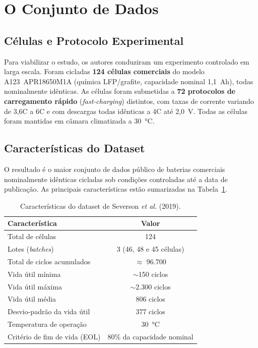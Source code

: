 \documentclass[12pt, a4paper]{article}
\begin{document}
\section{O Conjunto de Dados}

\subsection{Células e Protocolo Experimental}

Para viabilizar o estudo, os autores conduziram um experimento controlado em
larga escala. Foram cicladas \textbf{124 células comerciais} do modelo
A123~APR18650M1A (química LFP/grafite, capacidade nominal 1,1~Ah), todas
nominalmente idênticas. As células foram submetidas a \textbf{72 protocolos
de carregamento rápido} (\textit{fast-charging}) distintos, com taxas de
corrente variando de 3,6C a 6C e com descargas todas idênticas a 4C até
2,0~V. Todas as células foram mantidas em câmara climatizada a 30~°C.

\subsection{Características do Dataset}

O resultado é o maior conjunto de dados público de baterias comerciais
nominalmente idênticas cicladas sob condições controladas até a data de
publicação. As principais características estão sumarizadas na
Tabela~\ref{tab:dataset}.

\begin{table}[ht]
  \centering
  \caption{Características do dataset de Severson \textit{et al.} (2019).}
  \label{tab:dataset}
  \begin{tabular}{lc}
    \toprule
    \textbf{Característica} & \textbf{Valor} \\
    \midrule
    Total de células             & 124 \\
    Lotes (\textit{batches})     & 3 (46, 48 e 45 células) \\
    Total de ciclos acumulados   & $\approx$ 96.700 \\
    Vida útil mínima             & $\sim$150 ciclos \\
    Vida útil máxima             & $\sim$2.300 ciclos \\
    Vida útil média              & 806 ciclos \\
    Desvio-padrão da vida útil   & 377 ciclos \\
    Temperatura de operação      & 30~°C \\
    Critério de fim de vida (EOL)& 80\% da capacidade nominal \\
    \bottomrule
  \end{tabular}
\end{table}
\end{document}
